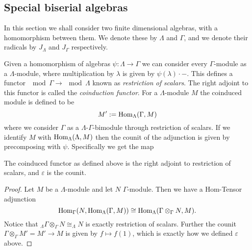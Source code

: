 \subsection{Special biserial algebras}\label{sec:special_biserial_algebras}
\cite{EHIS04}

In this section we shall consider two finite dimensional algebras, with a homomorphism between them. We denote these by $\Lambda$ and $\Gamma$, and we denote their radicals by $J_\Lambda$ and $J_\Gamma$ respectively.

\begin{defn}
	Given a homomorphism of algebras $\psi\colon\Lambda \to \Gamma$ we can consider every $\Gamma$-module as a $\Lambda$-module, where multiplication by $\lambda$ is given by $\psi(\lambda)\cdot -$. This defines a functor $\mod\Gamma \to \mod\Lambda$ known as \emph{restriction of scalars}. The right adjoint to this functor is called the \emph{coinduction functor}. For a $\Lambda$-module $M$ the coinduced module is defined to be
	$$M' := \operatorname{Hom}_\Lambda(\Gamma, M)$$
	where we consider $\Gamma$ as a $\Lambda$-$\Gamma$-bimodule through restriction of scalars. If we identify $M$ with $\operatorname{Hom}_\Lambda(\Lambda, M)$ then the counit of the adjunction is given by precomposing with $\psi$. Specifically we get the map
	\begin{center}
	\end{center}
\end{defn}

\begin{prop}\cite[Lemma~2.2]{EHIS04}\label{prop:coinduction_right_adjoint}
	The coinduced functor as defined above is the right adjoint to restriction of scalars, and $\varepsilon$ is the counit.
	\begin{proof}
		Let $M$ be a $\Lambda$-module and let $N$ $\Gamma$-module. Then we have a Hom-Tensor adjunction
		$$\operatorname{Hom}_\Gamma(N, \operatorname{Hom}_\Lambda(\Gamma, M)) \cong \operatorname{Hom}_\Lambda(\Gamma\otimes_\Gamma N, M).$$
		Notice that $_\Lambda\Gamma\otimes_\Gamma N \cong _\Lambda N$ is exactly restriction of scalars. Further the counit $\Gamma\otimes_\Gamma M' = M' \to M$ is given by $f\mapsto f(1)$, which is exactly how we defined $\varepsilon$ above.
	\end{proof}
\end{prop}


